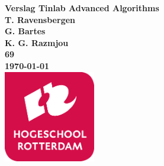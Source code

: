 \documentclass{article}
\begin{document}
	\sffamily
	\begin{titlepage}
		\centering
		\vfill
		{\bfseries\Huge
			Verslag Tinlab Advanced Algorithms \\
			\vskip2cm
		}
		{\bfseries\Large
			T. Ravensbergen\\ 
			G. Bartes\\
			K. G. Razmjou\\
		}
		{
			\bfseries\normalsize
			69\\
			\vskip1cm
			\today\\
		}    
		\vfill
		\includegraphics[width=4cm]{logohr.png} %
		\vfill
		\vfill
	\end{titlepage}
	\newpage
	\tableofcontents
	

	
	
	
	\cleardoublepage
	


	
	
	\cleardoublepage
	
		
	\cleardoublepage
	
	
	
	\begin{appendices}
		
	\end{appendices}
	
 
	
	\newpage
	
	
\end{document}
